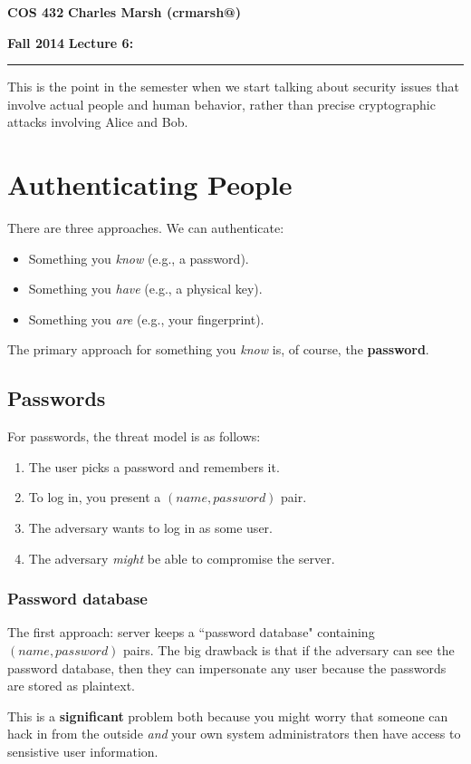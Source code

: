 \documentclass[12pt]{article}
\makeatletter
\newcommand{\myheader}[4]
{\vspace*{-0.5in}
\noindent
{#1} \hfill {#3}

\noindent
{#2} \hfill {#4}

\noindent
\rule[8pt]{\textwidth}{1pt}

\vspace{1ex} 
}  %
\newcommand{\myalgsheader}[0]
{\myheader
{ {\bf{COS 432}} }
{ {\bf{Fall 2014}} }
{ {\bf{Charles Marsh (crmarsh@)}} }
{ {\bf{Lecture 6: }} }
}
\makeatother
\begin{document}
\myalgsheader

\pagestyle{plain}

This is the point in the semester when we start talking about security issues that involve actual people and human behavior, rather than precise cryptographic attacks involving Alice and Bob.

\section*{Authenticating People}

There are three approaches. We can authenticate:
\begin{itemize}
\item Something you \textit{know} (e.g., a password).
\item Something you \textit{have} (e.g., a physical key).
\item Something you \textit{are} (e.g., your fingerprint).
\end{itemize}

The primary approach for something you \textit{know} is, of course, the \textbf{password}.

\subsection*{Passwords}

For passwords, the threat model is as follows:
\begin{enumerate}
\item The user picks a password and remembers it.
\item To log in, you present a $(name, password)$ pair.
\item The adversary wants to log in as some user.
\item The adversary \textit{might} be able to compromise the server.
\end{enumerate}

\subsubsection*{Password database}

The first approach: server keeps a ``password database" containing $(name, password)$ pairs. The big drawback is that if the adversary can see the password database, then they can impersonate any user because the passwords are stored as plaintext.

This is a \textbf{significant} problem both because you might worry that someone can hack in from the outside \textit{and} your own system administrators then have access to sensistive user information.
\end{document}
